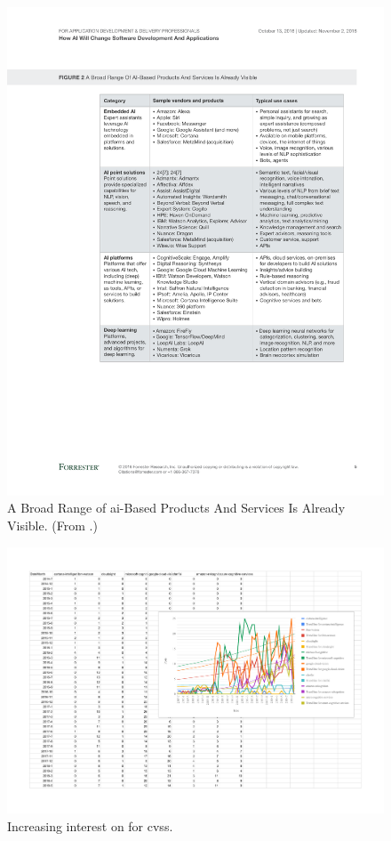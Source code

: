 \begin{figure}[p!]
\centering
\caption[Categorisation of AI-based products and services]{A Broad Range of \gls{ai}-Based Products And Services Is Already Visible. (From \citep{LoGiudice:2016wf}.)}
\label{fig:introduction:ai-products}
\includegraphics[width=\linewidth]{mainmatter/introduction/figures/ai-products}
\end{figure}

\begin{figure}[p!]
\centering
\caption[Increasing interest in the developer community of computer vision services]{Increasing interest on  for \glspl{cvs}.}
\label{fig:introduction:stackoverflow-trends}
\includegraphics[width=\linewidth]{mainmatter/introduction/figures/stackoverflow-trends}
\end{figure}

